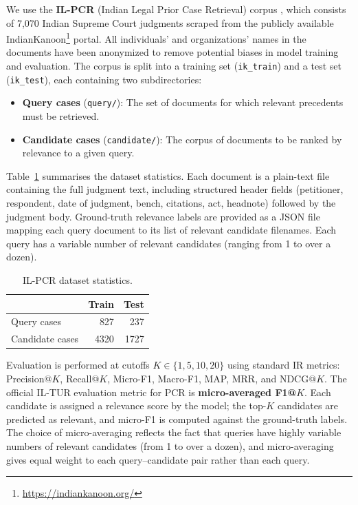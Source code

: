 \documentclass[11pt]{article}
\begin{document}
We use the \textbf{IL-PCR} (Indian Legal Prior Case Retrieval) corpus \cite{joshi2023ucreat}, which consists of 7,070 Indian Supreme Court judgments scraped from the publicly available IndianKanoon\footnote{\url{https://indiankanoon.org/}} portal.
All individuals' and organizations' names in the documents have been anonymized to remove potential biases in model training and evaluation.
The corpus is split into a training set (\texttt{ik\_train}) and a test set (\texttt{ik\_test}), each containing two subdirectories:
\begin{itemize}
    \item \textbf{Query cases} (\texttt{query/}): The set of documents for which relevant precedents must be retrieved.
    \item \textbf{Candidate cases} (\texttt{candidate/}): The corpus of documents to be ranked by relevance to a given query.
\end{itemize}

Table~\ref{tab:dataset} summarises the dataset statistics.
Each document is a plain-text file containing the full judgment text, including structured header fields (petitioner, respondent, date of judgment, bench, citations, act, headnote) followed by the judgment body.
Ground-truth relevance labels are provided as a JSON file mapping each query document to its list of relevant candidate filenames.
Each query has a variable number of relevant candidates (ranging from 1 to over a dozen).

\begin{table}[t]
\centering
\small
\begin{tabular}{@{}lrr@{}}
\toprule
& \textbf{Train} & \textbf{Test} \\
\midrule
Query cases     & 827  & 237  \\
Candidate cases & 4320 & 1727 \\
\bottomrule
\end{tabular}
\caption{IL-PCR dataset statistics.}
\label{tab:dataset}
\end{table}

Evaluation is performed at cutoffs $K \in \{1, 5, 10, 20\}$ using standard IR metrics: Precision@$K$, Recall@$K$, Micro-F1, Macro-F1, MAP, MRR, and NDCG@$K$.
The official IL-TUR evaluation metric for PCR is \textbf{micro-averaged F1@$K$}.
Each candidate is assigned a relevance score by the model; the top-$K$ candidates are predicted as relevant, and micro-F1 is computed against the ground-truth labels.
The choice of micro-averaging reflects the fact that queries have highly variable numbers of relevant candidates (from 1 to over a dozen), and micro-averaging gives equal weight to each query--candidate pair rather than each query.
\end{document}
